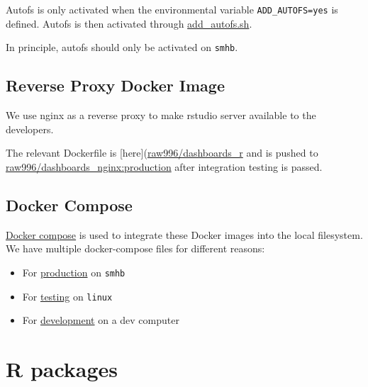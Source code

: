 \documentclass[12pt,]{article}
\providecommand{\tightlist}{%
  \setlength{\itemsep}{0pt}\setlength{\parskip}{0pt}}
\begin{document}
Autofs is only activated when the environmental variable
\texttt{ADD\_AUTOFS=yes} is defined. Autofs is then activated through
\href{https://github.com/raubreywhite/dashboards_control/blob/master/infrastructure/dashboards_r/add_autofs.sh}{add\_autofs.sh}.

In principle, autofs should only be activated on \texttt{smhb}.

\subsection{Reverse Proxy Docker
Image}\label{reverse-proxy-docker-image}

We use nginx as a reverse proxy to make rstudio server available to the
developers.

The relevant Dockerfile is
{[}here{]}(\href{https://github.com/raubreywhite/dashboards_control/blob/master/infrastructure/dashboards_nginx/Dockerfile}{raw996/dashboards\_r}
and is pushed to
\href{https://hub.docker.com/r/raw996/dashboards_nginx/}{raw996/dashboards\_nginx:production}
after integration testing is passed.

\subsection{Docker Compose}\label{docker-compose}

\href{https://docs.docker.com/compose/}{Docker compose} is used to
integrate these Docker images into the local filesystem. We have
multiple docker-compose files for different reasons:

\begin{itemize}
\tightlist
\item
  For
  \href{https://github.com/raubreywhite/dashboards_control/blob/master/infrastructure/docker-compose-prod.yml}{production}
  on \texttt{smhb}
\item
  For
  \href{https://github.com/raubreywhite/dashboards_control/blob/master/infrastructure/docker-compose-test.yml}{testing}
  on \texttt{linux}
\item
  For
  \href{https://github.com/raubreywhite/dashboards_control/blob/master/infrastructure/docker-compose-dev.yml}{development}
  on a dev computer
\end{itemize}

\section{R packages}\label{r-packages}
\end{document}
